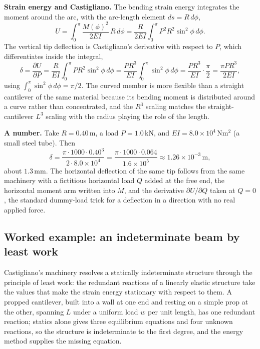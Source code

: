 \textbf{Strain energy and Castigliano.} The bending strain energy integrates
the moment around the arc, with the arc-length element $ds = R\,d\phi$,
\[
U = \int_0^\pi \frac{M(\phi)^2}{2EI}\,R\,d\phi
  = \frac{R}{2EI}\int_0^\pi P^2 R^2 \sin^2\phi\,d\phi.
\]
The vertical tip deflection is Castigliano's derivative with respect to $P$,
which differentiates inside the integral,
\[
\delta = \frac{\partial U}{\partial P}
       = \frac{R}{EI}\int_0^\pi P R^2 \sin^2\phi\,d\phi
       = \frac{P R^3}{EI}\int_0^\pi \sin^2\phi\,d\phi
       = \frac{P R^3}{EI}\cdot\frac{\pi}{2}
       = \frac{\pi P R^3}{2EI},
\]
using $\int_0^\pi \sin^2\phi\,d\phi = \pi/2$. The curved member is more
flexible than a straight cantilever of the same material because its bending
moment is distributed around a curve rather than concentrated, and the
$R^3$ scaling matches the straight-cantilever $L^3$ scaling with the radius
playing the role of the length.

\textbf{A number.} Take $R = 0.40\,\si{\meter}$, a load $P =
1.0\,\si{\kilo\newton}$, and $EI = 8.0\times 10^{4}\,\si{\newton\meter
\squared}$ (a small steel tube). Then
\[
\delta = \frac{\pi\cdot 1000\cdot 0.40^3}{2\cdot 8.0\times 10^{4}}
= \frac{\pi\cdot 1000\cdot 0.064}{1.6\times 10^{5}}
\approx 1.26\times 10^{-3}\,\si{\meter},
\]
about $1.3\,\si{\milli\meter}$. The horizontal deflection of the same tip
follows from the same machinery with a fictitious horizontal load $Q$ added
at the free end, the horizontal moment arm written into $M$, and the
derivative $\partial U/\partial Q$ taken at $Q = 0$, the standard
dummy-load trick for a deflection in a direction with no real applied force.

\subsection{Worked example: an indeterminate beam by least work}

Castigliano's machinery resolves a statically indeterminate structure
through the principle of least work: the redundant reactions of a linearly
elastic structure take the values that make the strain energy stationary
with respect to them. A propped cantilever, built into a wall at one end and
resting on a simple prop at the other, spanning $L$ under a uniform load $w$
per unit length, has one redundant reaction; statics alone gives three
equilibrium equations and four unknown reactions, so the structure is
indeterminate to the first degree, and the energy method supplies the
missing equation.

